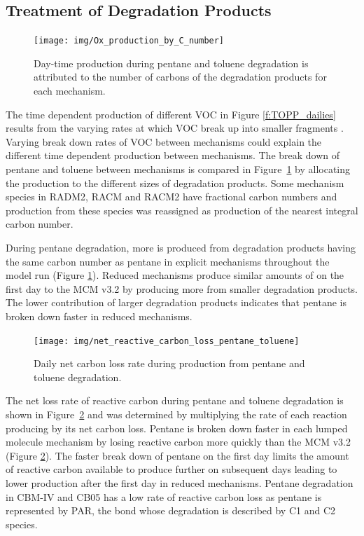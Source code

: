 \subsection{Treatment of Degradation Products} \label{ss:products} 
%
\begin{figure}
    \centering
    \texttt{[image: img/Ox\_production\_by\_C\_number]}
    \vspace{0mm}
    \caption{Day-time  production during pentane and toluene degradation is attributed to the number of carbons of the degradation products for each mechanism.}
    \vspace{-4mm}
    \label{f:carbon}
\end{figure}
%
The time dependent  production of different VOC in Figure \ref{f:TOPP_dailies} results from the varying rates at which VOC break up into smaller fragments \citep{Butler:2011}.
Varying break down rates of VOC between mechanisms could explain the different time dependent  production between mechanisms.
The break down of pentane and toluene between mechanisms is compared in \mbox{Figure \ref{f:carbon}} by allocating the  production to the different sizes of degradation products.
Some mechanism species in RADM2, RACM and RACM2 have fractional carbon numbers \citep{Stockwell:1990, Stockwell:1997, Goliff:2013} and  production from these species was reassigned as  production of the nearest integral carbon number.  

During pentane degradation, more  is produced from degradation products having the same carbon number as pentane in explicit mechanisms throughout the model run (Figure \ref{f:carbon}).
Reduced mechanisms produce similar amounts of  on the first day to the MCM v3.2 by producing more  from smaller degradation products.
The lower contribution of larger degradation products indicates that pentane is broken down faster in reduced mechanisms.

\begin{figure}
    \centering
    \texttt{[image: img/net\_reactive\_carbon\_loss\_pentane\_toluene]}
    \vspace{0mm}
    \caption{Daily net carbon loss rate during  production from pentane and toluene degradation.}
    \vspace{-4mm}
    \label{f:net_carbon_loss}
\end{figure}

The net loss rate of reactive carbon during pentane and toluene degradation is shown in \mbox{Figure \ref{f:net_carbon_loss}} and was determined by multiplying the rate of each reaction producing  by its net carbon loss.
Pentane is broken down faster in each lumped molecule mechanism by losing reactive carbon more quickly than the MCM v3.2 (Figure \ref{f:net_carbon_loss}).
The faster break down of pentane on the first day limits the amount of reactive carbon available to produce further  on subsequent days leading to lower  production after the first day in reduced mechanisms.
Pentane degradation in CBM-IV and CB05 has a low rate of reactive carbon loss as pentane is represented by PAR, the  bond whose degradation is described by C1 and C2 species.

